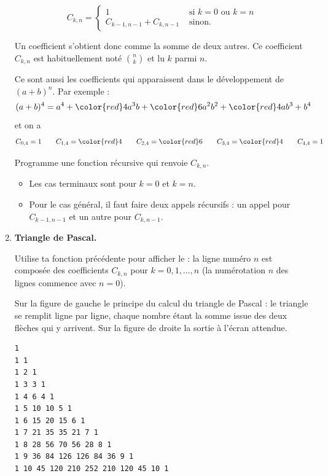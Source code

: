 \documentclass[11pt,class=report,crop=false]{standalone}
\begin{document}
\begin{activite}
\begin{enumerate}
  $$C_{k,n} = 
  \begin{cases}
  1 & \text{ si } k=0 \text{ ou } k=n \\
  C_{k-1,n-1} + C_{k,n-1} & \text{ sinon.}
  \end{cases}$$
  
  Un coefficient s'obtient donc comme la somme de deux autres.
  Ce coefficient $C_{k,n}$ est habituellement noté $\binom{n}{k}$ et lu \og{}$k$ parmi $n$\fg{}.
  
  

Ce sont aussi les coefficients qui apparaissent dans le développement de $(a+b)^n$.  
Par exemple :
$$(a+b)^4 = a^4 + {\color{red}4}a^3b + {\color{red}6}a^2b^2 + {\color{red}4}ab^3 + b^4$$
et on a 
$$C_{0,4} = 1 \qquad  C_{1,4} = {\color{red}4} \qquad C_{2,4} = {\color{red}6} \qquad C_{3,4} = {\color{red}4} \qquad C_{4,4} = 1$$
  
  Programme une fonction récursive  qui renvoie $C_{k,n}$.
  \begin{itemize}
    \item Les cas terminaux sont pour $k=0$ et $k=n$.
    \item Pour le cas général, il faut faire deux appels récursifs : un appel pour $C_{k-1,n-1}$ et un autre pour $C_{k,n-1}$.
  \end{itemize}
  
  \item \textbf{Triangle de Pascal.}
  
  Utilise ta fonction précédente pour afficher le  :
  la ligne numéro $n$ est composée des coefficients $C_{k,n}$ pour $k=0,1,\ldots,n$ (la numérotation $n$ des lignes commence avec $n=0$).

Sur la figure de gauche le principe du calcul du triangle de Pascal : le triangle se remplit ligne par ligne, chaque nombre étant la somme issue des deux flèches qui y arrivent. Sur la figure de droite la sortie à l'écran attendue.

\begin{center} 
\begin{minipage}{0.4\textwidth}   
 \end{minipage}\quad
\begin{minipage}{0.5\textwidth} 
\begin{lstlisting}
1 
1 1 
1 2 1 
1 3 3 1 
1 4 6 4 1 
1 5 10 10 5 1 
1 6 15 20 15 6 1 
1 7 21 35 35 21 7 1 
1 8 28 56 70 56 28 8 1 
1 9 36 84 126 126 84 36 9 1 
1 10 45 120 210 252 210 120 45 10 1
\end{lstlisting}
\end{minipage}
\end{center} 
  

\end{enumerate}
\end{activite}
\end{document}
